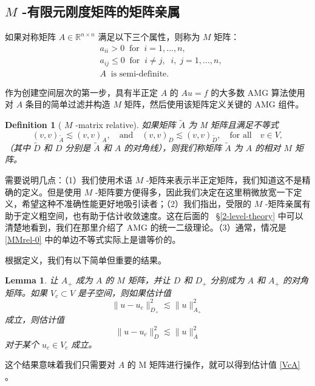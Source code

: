 \documentclass[12pt]{acta_2011xz}
\newtheorem{lemma}[theorem]{Lemma}
\newtheorem{definition}[theorem]{Definition}
\begin{document}
   \subsection{   $M$    -有限元刚度矩阵的矩阵亲属  }       \label{sec:m-matrix}    如果对称矩阵    $A \in \mathbb R^{n\times n}$    满足以下三个属性，则称为    $M$    矩阵：
   \begin{align}
\label{eq:sign1} &a_{ii} > 0 \;\;\text{for}\;\; i = 1,...,n, \\ 
\label{eq:sign2} &a_{ij} \le 0 \;\;
                  \text{for}\;\; i \ne j, \;\;i, \;j = 1,...,n, \\ 
\label{eq:sign3} &A \;\;\text{is semi-definite}.
\end{align}     

作为创建空间层次的第一步，具有半正定    $A$    的    $Au = f$    的大多数 AMG 算法使用对    $A$    条目的简单过滤并构造    $M$    矩阵，然后使用该矩阵定义关键的 AMG 组件。
   \begin{definition}[        $M$        -matrix relative]如果矩阵
   $\widetilde A$    为 M 矩阵且满足不等式
   \begin{equation}\label{MMrel-0}
(v,v)_{\widetilde{A}} \lesssim (v,v)_{A}, \quad\mbox{and}\quad
(v,v)_{D}\lesssim (v,v)_{\widetilde{D}}, \quad \mbox{for all} \quad v\in V,
\end{equation}   （其中    $\widetilde D$    和    $D$    分别是    $\widetilde{A}$    和    $A$    的对角线），则我们称矩阵
   $\widetilde A$    为    $A$    的相对    $M$    矩阵。  \end{definition}     

需要说明几点：（1）我们使用术语    $M$    -矩阵来表示半正定矩阵，我们知道这不是精确的定义。但是使用    $M$    -矩阵要方便得多，因此我们决定在这里稍微放宽一下定义，希望这种不准确性能更好地吸引读者；（2）我们指出，受限的    $M$    -矩阵亲属有助于定义粗空间，也有助于估计收敛速度。这在后面的~    \S       \ref{2-level-theory}    中可以清楚地看到，我们在那里介绍了 AMG 的统一二级理论。（3）通常，情况是~    \eqref{MMrel-0}    中的单边不等式实际上是谱等价的。  

根据定义，我们有以下简单但重要的结果。
   \begin{lemma}   \label{lemma-equiv}    让    $A_+$    成为    $A$    的
   $M$    矩阵，并让    $D$    和    $D_+$    分别成为
   $A$    和    $A_+$    的对角矩阵。如果    $V_c\subset V$    是子空间，则如果估计值
   \begin{equation}
  \label{VcA+}
\| u - u_c \|_{D_+}^2\lesssim \|u\|_{A_+}^2  
\end{equation}    成立，则估计值
   \begin{equation}
    \label{VcA}
\|u - u_c\|_D^2\lesssim \|u\|_A^2    
  \end{equation}    对于某个    $u_c\in V_c$    成立。  \end{lemma}    这个结果意味着我们只需要对    $A$    的 M 矩阵进行操作，就可以得到估计值    \eqref{VcA}    。  
\end{document}
